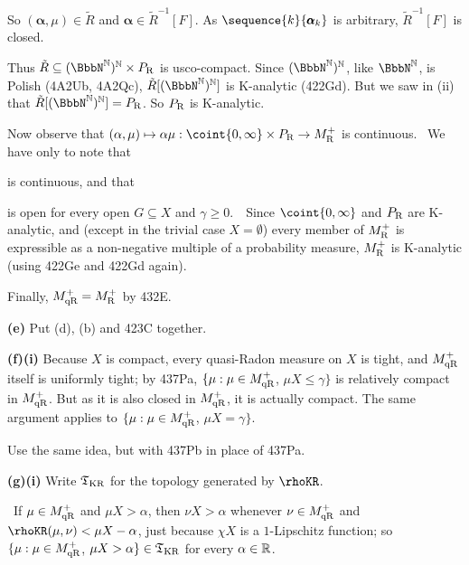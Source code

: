 {\noindent So $(\pmb{\alpha},\mu)\in\tilde R$ and
$\pmb{\alpha}\in\tilde R^{-1}[F]$.   As $\sequence{k}{\pmb{\alpha}_k}$ is
arbitrary, $\tilde R^{-1}[F]$ is closed.\ \Qed

\medskip

 Thus $\tilde R\subseteq(\NN)^{\Bbb N}\times\PR$ is
usco-compact.   Since $(\NN)^{\Bbb N}$, like $\NN$, is Polish (4A2Ub,
4A2Qc), $\tilde R[(\NN)^{\Bbb N}]$ is K-analytic (422Gd).   But we saw in
(ii) that $\tilde R[(\NN)^{\Bbb N}]=\PR$.   So $P_{\text{R}}$ is K-analytic.

\medskip

 Now observe that
$(\alpha,\mu)\mapsto\alpha\mu:\coint{0,\infty}\times\PR\to\MR$ is
continuous.   \Prf\ We have only to note that


\noindent is continuous, and that


\noindent is open for every open $G\subseteq X$ and $\gamma\ge 0$.\ \QeD\
Since $\coint{0,\infty}$ and $P_{\text{R}}$ are K-analytic, and (except in the
trivial case $X=\emptyset$) every member of
$M^+_{\text{R}}$ is expressible as a non-negative multiple of a probability measure,
$M^+_{\text{R}}$ is K-analytic (using 422Ge and 422Gd again).

\medskip

 Finally, $M^+_{\text{qR}}=M^+_{\text{R}}$ by 432E.

\medskip

{\bf (e)} Put (d), (b) and 423C together.

\medskip

{\bf (f)(i)} Because $X$ is compact, every quasi-Radon measure on $X$ is
tight, and $M^+_{\text{qR}}$ itself is uniformly tight;
by 437Pa, $\{\mu:\mu\in M^+_{\text{qR}}$, $\mu X\le\gamma\}$
is relatively compact in $M^+_{\text{qR}}$.   But as
it is also closed in $M^+_{\text{qR}}$, it is actually compact.   The same argument
applies to $\{\mu:\mu\in M^+_{\text{qR}}$, $\mu X=\gamma\}$.

\medskip

 Use the same idea, but with 437Pb in place of 437Pa.

\medskip

{\bf (g)(i)} Write $\frak T_{\text{KR}}$ for the topology generated by
$\rhoKR$.

\medskip

\qquad\grheada\ If $\mu\in M^+_{\text{qR}}$ and $\mu X>\alpha$, then $\nu X>\alpha$
whenever $\nu\in M^+_{\text{qR}}$ and $\rhoKR(\mu,\nu)<\mu X-\alpha$, just because
$\chi X$ is a $1$-Lipschitz function;  so
$\{\mu:\mu\in M^+_{\text{qR}}$, $\mu X>\alpha\}\in\frak T_{\text{KR}}$ for every
$\alpha\in\Bbb R$.

}
